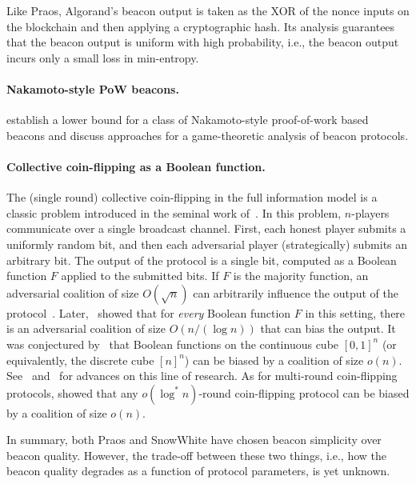 Like Praos, Algorand's beacon output is taken as 
the XOR of the nonce inputs on the blockchain and then applying a cryptographic hash.
Its analysis guarantees that the beacon output 
is uniform with high probability, i.e., 
the beacon output incurs only a small loss in min-entropy. 



\paragraph{Nakamoto-style PoW beacons.} 
\citet{ZuckermanBeacon} establish a lower bound for a class of
Nakamoto-style proof-of-work based beacons and discuss approaches for
a game-theoretic analysis of beacon protocols.


\paragraph{Collective coin-flipping as a Boolean function.} 
The (single round) collective coin-flipping in the full information
model is a classic problem introduced in the seminal work
of~\citet{BL85}.  In this problem, $n$-players communicate over a
single broadcast channel.  First, each honest player submits a
uniformly random bit, and then each adversarial player (strategically)
submits an arbitrary bit.  The output of the protocol is a single bit,
computed as a Boolean function $F$ applied to the submitted bits.  If
$F$ is the majority function, an adversarial coalition of size
$O(\sqrt{n})$ can arbitrarily influence the output of the
protocol~\cite{BL85}.  Later,~\citet*{KKL} showed that for
\emph{every} Boolean function $F$ in this setting, there is an
adversarial coalition of size $O(n/(\log n))$ that can bias the
output.  It was conjectured by~\citet{Friedgut} that Boolean functions
on the continuous cube $[0,1]^n$ (or equivalently, the discrete cube
$[n]^n$) can be biased by a coalition of size $o(n)$.
See~\cite{Hatami} and~\cite{Kalai} for advances on this line of
research.  As for multi-round coin-flipping protocols, \citet*{RSZ}
showed that any $o(\log^* n)$-round coin-flipping protocol can be
biased by a coalition of size $o(n)$.



In summary, both Praos and SnowWhite have chosen beacon simplicity 
over beacon quality. 
However, the trade-off between these two things, 
i.e., how the beacon quality degrades as a function of protocol parameters, 
is yet unknown.
